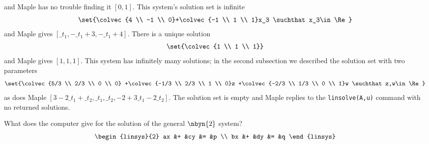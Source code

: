 \begin{exercises}
\begin{answer}
\begin{exparts}
\begin{equation*}
          \end{equation*}
          and Maple has no trouble finding it $[0,1]$.
        \partsitem This system's solution set is infinite
          \begin{equation*}
            \set{\colvec{4 \\ -1 \\ 0}+\colvec{-1 \\ 1 \\ 1}x_3
                             \suchthat x_3\in\Re}
          \end{equation*}
          and Maple gives $[\_t_1,-\_t_1+3,-\_t_1+4]$.
        \partsitem There is a unique solution
           \begin{equation*}
             \set{\colvec{1 \\ 1 \\ 1}}
           \end{equation*}
           and Maple gives $[1,1,1]$.
        \partsitem This system has infinitely many solutions; in the 
           second subsection we described the solution set with
           two parameters
           \begin{equation*}
             \set{\colvec{5/3 \\ 2/3 \\ 0 \\ 0}
                  +\colvec{-1/3 \\ 2/3 \\ 1 \\ 0}z
                  +\colvec{-2/3 \\ 1/3 \\ 0 \\ 1}w
                  \suchthat z,w\in\Re}
           \end{equation*}
           as does Maple $[3-2\_t_1+\_t_2,\_t_1,\_t_2,-2+3\_t_1-2\_t_2]$.
        \partsitem The solution set is empty and Maple replies to the
           \texttt{linsolve(A,u)} command with no returned solutions.
      \end{exparts}
    \end{answer}
  \item 
    What does the computer give for the solution of the general
    $\nbyn{2}$  system?
    \begin{equation*}
      \begin{linsys}{2}
        ax  &+  &cy  &=  &p  \\
        bx  &+  &dy  &=  &q
      \end{linsys}
    \end{equation*}

\end{exercises}
